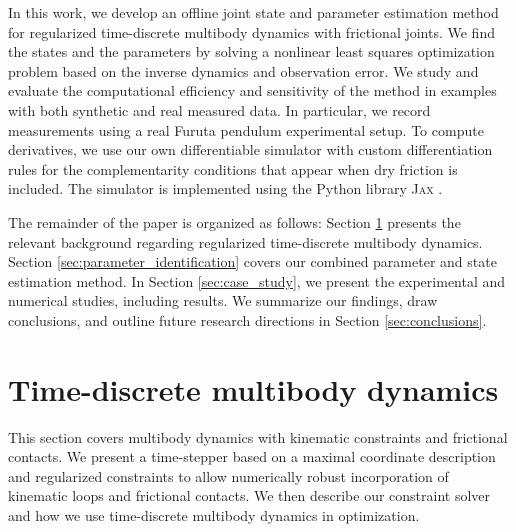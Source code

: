 \documentclass[preprint,12pt]{elsarticle}
\numberwithin{equation}{section}
\begin{document}
In this work, we develop an offline joint state and parameter estimation method for regularized time-discrete multibody dynamics with frictional joints.
We find the states and the parameters by solving a nonlinear least squares optimization problem based on the inverse dynamics and observation error.
We study and evaluate the computational efficiency and sensitivity of the method in examples with both synthetic and real measured data.
In particular, we record measurements using a real Furuta pendulum experimental setup.
To compute derivatives, we use our own differentiable simulator with custom differentiation rules for the complementarity conditions that appear when dry friction is included. 
The simulator is implemented using the Python library \textsc{Jax} \cite{jax2018github}.

The remainder of the paper is organized as follows:
Section \ref{sec:multibody_dynamics} presents the relevant background regarding regularized time-discrete multibody dynamics.
Section \ref{sec:parameter_identification} covers our combined parameter and state estimation method.
In Section \ref{sec:case_study}, we present the experimental and numerical studies, including results.
We summarize our findings, draw conclusions, and outline future research directions in Section \ref{sec:conclusions}.

\section{Time-discrete multibody dynamics}
\label{sec:multibody_dynamics}
This section covers multibody dynamics with kinematic constraints and frictional contacts.
We present a time-stepper based on a maximal coordinate description and regularized constraints to allow numerically robust incorporation of kinematic loops and frictional contacts.
We then describe our constraint solver and how we use time-discrete multibody dynamics in optimization.
\end{document}
